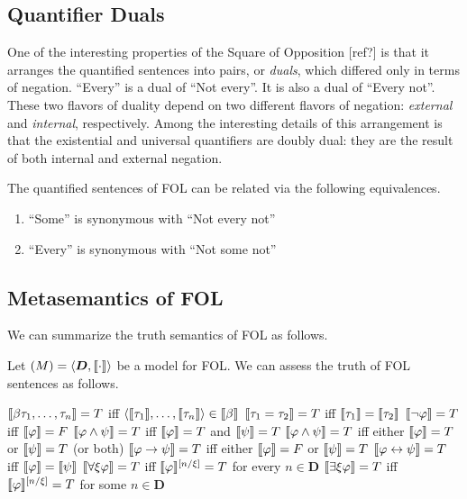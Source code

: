 \subsection{Quantifier Duals}

One of the interesting properties of the Square of Opposition [ref?] is that it
arranges the quantified sentences into pairs, or \emph{duals}, which differed
only in terms of negation. ``Every'' is a dual of ``Not every''. It is also a
dual of ``Every not''. These two flavors of duality depend on two different
flavors of negation: \emph{external} and \emph{internal}, respectively. Among
the interesting details of this arrangement is that the existential and
universal quantifiers are doubly dual: they are the result of both internal and
external negation.

\begin{observation}
  \label{obs:quantifer-duals}
  The quantified sentences of FOL can be related via the following equivalences.
  \begin{enumerate}
    \item ``Some'' is synonymous with ``Not every not''
    \item ``Every'' is synonymous with ``Not some not''
  \end{enumerate}
\end{observation}

\subsection{Metasemantics of FOL}

We can summarize the truth semantics of FOL as follows.

\begin{definition}
  \label{def:fol-truth}
  Let $\mathcal(M)=\langle\boldsymbol{D},\llbracket\cdot\rrbracket\rangle$ be a model for
  FOL. We can assess the truth of FOL sentences as follows.
  \begin{outline}[enumerate]
    \1 $\llbracket\beta\tau_1,\dots,\tau_n\rrbracket=T$ iff
    $\langle\llbracket\tau_1\rrbracket,\dots,\llbracket\tau_n\rrbracket\rangle\in \llbracket\beta\rrbracket$
    \1 $\llbracket\tau_1=\tau_2\rrbracket=T$ iff $\llbracket\tau_1\rrbracket=\llbracket\tau_2\rrbracket$
    \1 $\llbracket\neg\varphi\rrbracket=T$ iff $\llbracket\varphi\rrbracket=F$ 
    \1 $\llbracket\varphi\wedge\psi\rrbracket=T$ iff $\llbracket\varphi\rrbracket=T$ and
    $\llbracket\psi\rrbracket=T$
    \1 $\llbracket\varphi\wedge\psi\rrbracket=T$ iff either $\llbracket\varphi\rrbracket=T$ or
    $\llbracket\psi\rrbracket=T$ (or both)
    \1 $\llbracket\varphi\rightarrow\psi\rrbracket=T$ iff either $\llbracket\varphi\rrbracket=F$
    or $\llbracket\psi\rrbracket=T$
    \1 $\llbracket\varphi\leftrightarrow\psi\rrbracket=T$ iff $\llbracket\varphi\rrbracket=\llbracket\psi\rrbracket$
    \1 $\llbracket\forall\xi\varphi\rrbracket=T$ iff
    $\llbracket\varphi\rrbracket^{[n/\xi]}=T$ for every $n\in\mathbf{D}$
    \1 $\llbracket\exists \xi\varphi\rrbracket=T$ iff
    $\llbracket\varphi\rrbracket^{[n/\xi]}=T$ for some $n\in\mathbf{D}$
  \end{outline}

\end{definition}


